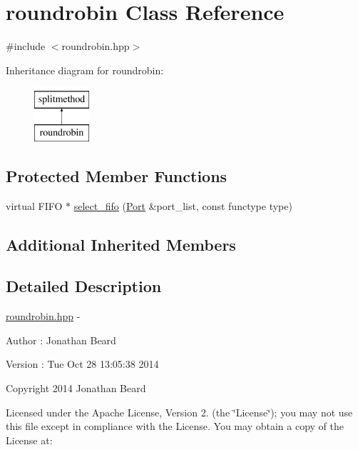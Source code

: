 \hypertarget{classroundrobin}{}\section{roundrobin Class Reference}
\label{classroundrobin}


{\ttfamily \#include $<$roundrobin.\+hpp$>$}

Inheritance diagram for roundrobin\+:\begin{figure}[H]
\begin{center}
\leavevmode
\includegraphics[height=2.000000cm]{classroundrobin}
\end{center}
\end{figure}
\subsection*{Protected Member Functions}
\begin{DoxyCompactItemize}
\item 
virtual F\+I\+F\+O $\ast$ \hyperlink{classroundrobin_acd670a96e62905062e50b21c3d5d64c5}{select\+\_\+fifo} (\hyperlink{class_port}{Port} \&port\+\_\+list, const functype type)
\end{DoxyCompactItemize}
\subsection*{Additional Inherited Members}


\subsection{Detailed Description}
\hyperlink{roundrobin_8hpp_source}{roundrobin.\+hpp} -\/ \begin{DoxyAuthor}{Author}
\+: Jonathan Beard 
\end{DoxyAuthor}
\begin{DoxyVersion}{Version}
\+: Tue Oct 28 13\+:05\+:38 2014
\end{DoxyVersion}
Copyright 2014 Jonathan Beard

Licensed under the Apache License, Version 2. (the \char`\"{}\+License\char`\"{}); you may not use this file except in compliance with the License. You may obtain a copy of the License at\+:

